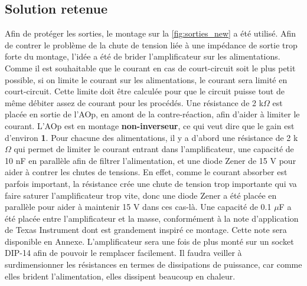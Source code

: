 \documentclass{report}
\begin{document}
\subsection{Solution retenue}
Afin de protéger les sorties, le montage sur la  \ref{fig:sorties_new} a été utilisé. Afin de contrer le problème de la chute de tension liée à une impédance de sortie trop forte du montage, l'idée a été de brider l'amplificateur sur les alimentations. Comme il est souhaitable que le courant en cas de court-circuit soit le plus petit possible, si on limite le courant sur les alimentations, le courant sera limité en court-circuit. Cette limite doit être calculée pour que le circuit puisse tout de même débiter assez de courant pour les procédés. Une résistance de 2 k$\Omega$ est placée en sortie de l'AOp, en amont de la contre-réaction, afin d'aider à limiter le courant. L'AOp est en montage \textbf{non-inverseur}, ce qui veut dire que le gain est d'environ \textbf{1}. Pour chacune des alimentations, il y a d'abord une résistance de 2 k$\Omega$ qui permet de limiter le courant entrant dans l'amplificateur, une capacité de 10 nF en parallèle afin de filtrer l'alimentation, et une diode Zener de 15 V pour aider à contrer les chutes de tensions. En effet, comme le courant absorber est parfois important, la résistance crée une chute de tension trop importante qui va faire saturer l'amplificateur trop vite, donc une diode Zener a été placée en parallèle pour aider à maintenir 15 V dans ces cas-là. Une capacité de 0.1 $\mu$F a été placée entre l'amplificateur et la masse, conformément à la note d'application de Texas Instrument dont est grandement inspiré ce montage. Cette note sera disponible en Annexe. L'amplificateur sera une fois de plus monté sur un socket DIP-14 afin de pouvoir le remplacer facilement. Il faudra veiller à surdimensionner les résistances en termes de dissipations de puissance, car comme elles brident l'alimentation, elles dissipent beaucoup en chaleur.
\end{document}
